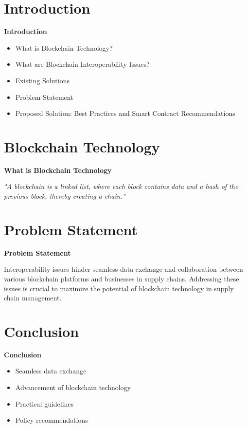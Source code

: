 \documentclass{beamer}
\begin{document}
\section{Introduction}
\begin{frame}
\textbf{\Large Introduction}

\vspace{0.5cm}
\begin{itemize}
    \item What is Blockchain Technology?
    \item What are Blockchain Interoperability Issues?
    \item Existing Solutions
    \item Problem Statement
    \item Proposed Solution: Best Practices and Smart Contract Recommendations
\end{itemize}
\end{frame}

\section{Blockchain Technology}
\begin{frame}
\textbf{\Large What is Blockchain Technology}

\vspace{0.5cm}
\textit{"A blockchain is a linked list, where each block contains data and a hash of the previous block, thereby creating a chain."}
\end{frame}

\section{Problem Statement}
\begin{frame}
\textbf{\Large Problem Statement}

\vspace{0.5cm}
Interoperability issues hinder seamless data exchange and collaboration between various blockchain platforms and businesses in supply chains. Addressing these issues is crucial to maximize the potential of blockchain technology in supply chain management.
\end{frame}

\section{Conclusion}
\begin{frame}
\textbf{\Large Conclusion}

\vspace{0.5cm}
\begin{itemize}
    \item Seamless data exchange
    \item Advancement of blockchain technology
    \item Practical guidelines
    \item Policy recommendations
\end{itemize}
\end{frame}
\end{document}

